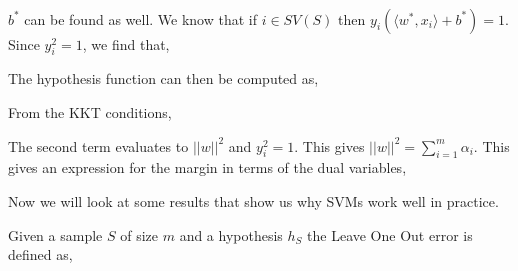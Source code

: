 \documentclass[a4paper,english,12pt]{article}
\begin{document}
~

\begin{note}
$b^*$ can be found as well. We know that if $i \in SV(S)$ then $y_i(\langle w^*,x_i \rangle + b^* ) =  1$. Since $y_i^2 = 1$, we find that,
\end{note}

\begin{note}
The hypothesis function can then be computed as,

\end{note}

\begin{note}

From the KKT conditions,


The second term evaluates to $|| w||^2$ and $y_i^2 = 1$. This gives $ || w||^2 =  \sum_{i = 1}^m \alpha_i $. This gives an expression for the margin in terms of the dual variables,

\end{note}

Now we will look at some results that show us why SVMs work well in practice.

\begin{defn}
Given a sample $S$ of size $m$ and a hypothesis $h_S$ the Leave One Out error is defined as,


\end{defn}

\begin{lem}
\end{lem}

\end{document}
